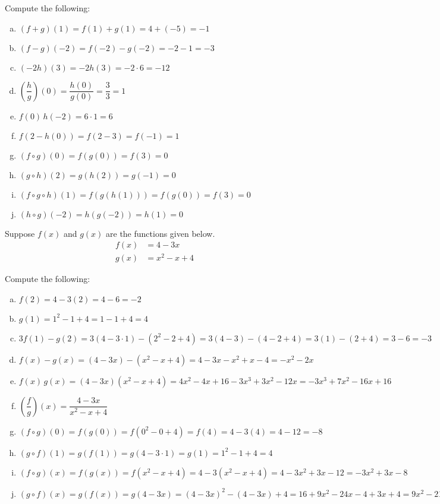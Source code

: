 \documentclass[11pt,letterpaper]{article}
\begin{document}
Compute the following: \pspace
        \begin{enumerate}[(a)]
        \item $(f + g)(1)= f(1) + g(1)= 4 + (-5)= -1$ \vfill
        \item $(f - g)(-2)= f(-2) - g(-2)= -2 - 1= -3$ \vfill
        \item $(-2h)(3)= -2h(3)= -2 \cdot 6= -12$ \vfill
        \item $\left(\dfrac{h}{g}\right)(0)= \dfrac{h(0)}{g(0)}= \dfrac{3}{3}= 1$ \vfill
        \item $f(0)\, h(-2)= 6 \cdot 1= 6$ \vfill
        \item $f(2 - h(0))= f(2 - 3)= f(-1)= 1$ \vfill
        \item $(f \circ g)(0)= f(g(0))= f(3)= 0$ \vfill
        \item $(g \circ h)(2)= g(h(2))= g(-1)= 0$ \vfill
        \item $(f \circ g \circ h)(1)= f(g(h(1)))= f(g(0))= f(3)= 0$ \vfill
        \item $(h \circ g)(-2)= h(g(-2))= h(1)= 0$
        \end{enumerate} \pspace



\newpage



 Suppose $f(x)$ and $g(x)$ are the functions given below. 
	\[
	\begin{aligned}
	f(x)&= 4 - 3x \\[0.3cm]
	g(x)&= x^2 - x + 4
	\end{aligned}
	\]

Compute the following: \pspace
\begin{enumerate}[(a)]
\item $f(2)= 4 - 3(2)= 4 - 6= -2$ \vfill
\item $g(1)= 1^2 - 1 + 4= 1 - 1 + 4= 4$ \vfill
\item $3f(1) - g(2)= 3(4 - 3 \cdot 1) - (2^2 - 2 + 4)= 3(4 - 3) - (4 - 2 + 4)= 3(1) - (2 + 4)= 3 - 6= -3$ \vfill
\item $f(x) - g(x)= (4 - 3x) - (x^2 - x + 4)= 4 - 3x - x^2 + x - 4= -x^2 - 2x$ \vfill
\item $f(x) \, g(x)= (4 - 3x)(x^2 - x + 4)= 4x^2 - 4x + 16 - 3x^3 + 3x^2 - 12x= -3x^3 + 7x^2 - 16x + 16$ \vfill
\item $\left( \dfrac{f}{g} \right)(x)= \dfrac{4 - 3x}{x^2 - x + 4}$ \vfill
\item $(f \circ g)(0)= f(g(0))= f(0^2 - 0 + 4)= f(4)= 4 - 3(4)= 4 - 12= -8$ \vfill
\item $(g \circ f)(1)= g(f(1))= g(4 - 3 \cdot 1)= g(1)= 1^2 - 1 + 4= 4$ \vfill
\item $(f \circ g)(x)= f(g(x))= f(x^2 - x + 4)= 4 - 3(x^2 - x + 4)= 4 - 3x^2 + 3x - 12= -3x^2 + 3x - 8$ \vfill
\item $(g \circ f)(x)= g(f(x))= g(4 - 3x)= (4 - 3x)^2 - (4 - 3x) + 4= 16 + 9x^2 - 24x - 4 + 3x + 4= 9x^2 - 21x + 16$ \vfill
\end{enumerate} \pspace
\end{document}
